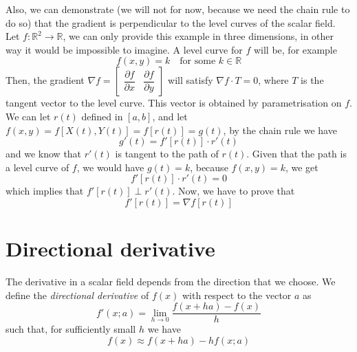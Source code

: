 \documentclass[../linear-spaces.tex]{subfiles}
\begin{document}
Also, we can demonstrate (we will not for now, because we need the chain rule
to do so) that the gradient is perpendicular to the
level curves of the scalar field. Let $f: \mathbb{R}^{2} \to \mathbb{R}$, we
can only provide this example in three dimensions,
in other way it would be impossible to imagine. A level curve for $f$ will be,
for example
\begin{equation}
    f(x,y)=k\quad \text{for some } k \in \mathbb{R}
\end{equation}
Then, the gradient $\nabla f = \begin{bmatrix}	\dfrac{\partial f}{\partial x}
         & \dfrac{\partial f}{\partial y}\end{bmatrix}$ will
satisfy $\nabla f \cdot T = 0$, where $T$ is the tangent vector to the level
curve. This vector is obtained by parametrisation on
$f$. We can let $r(t)$ defined in $[a,b]$, and let $f(x,y) = f\left[X(t),
        Y(t)\right] = f\left[r(t)\right] = g(t)$, by the chain rule
we have
\begin{equation}
    g'(t) = f'\left[r(t)\right]\cdot r'(t)
\end{equation}
and we know that $r'(t)$ is tangent to the path of $r(t)$. Given that the path
is a level curve of $f$, we would have $g(t) = k$, because
$f(x,y) = k$, we get
\begin{equation}
    f'\left[r(t)\right]\cdot r'(t) = 0
\end{equation}
which implies that $f'\left[r(t)\right] \perp r'(t)$. Now, we have to prove
that
\begin{equation}
    f'\left[r(t)\right] = \nabla f[r(t)]
\end{equation}

\section{Directional derivative}

The derivative in a scalar field depends from the direction that we choose. We
define
the \textit{directional derivative} of $f(x)$ with respect to the vector $a$ as
\begin{equation}
    f'(x; a) = \lim_{h\to 0}\dfrac{f(x + ha) - f(x)}{h}
\end{equation}
such that, for sufficiently small $h$ we have
\begin{equation}
    f(x) \approx f(x+ha) - h f(x; a)
\end{equation}
\end{document}
